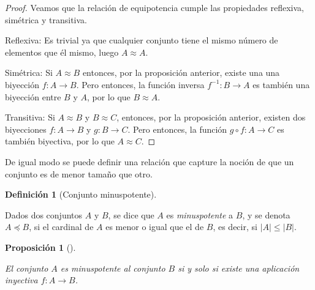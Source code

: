 \documentclass[
  a4paper,
]{scrreport}
\theoremstyle{plain}
\theoremstyle{plain}
\theoremstyle{definition}
\newtheorem{definition}{Definición}[chapter]
\theoremstyle{definition}
\theoremstyle{plain}
\newtheorem{proposition}{Proposición}[chapter]
\theoremstyle{definition}
\theoremstyle{remark}
\begin{document}
\begin{tcolorbox}[enhanced jigsaw, rightrule=.15mm, toptitle=1mm, colbacktitle=quarto-callout-note-color!10!white, bottomrule=.15mm, opacityback=0, arc=.35mm, breakable, toprule=.15mm, left=2mm, coltitle=black, colback=white, opacitybacktitle=0.6, titlerule=0mm, colframe=quarto-callout-note-color-frame, bottomtitle=1mm, title=\textcolor{quarto-callout-note-color}{\faInfo}\hspace{0.5em}{Demostración}, leftrule=.75mm]

\begin{proof}

Veamos que la relación de equipotencia cumple las propiedades reflexiva,
simétrica y transitiva.

Reflexiva: Es trivial ya que cualquier conjunto tiene el mismo número de
elementos que él mismo, luego \(A\approx A\).

Simétrica: Si \(A\approx B\) entonces, por la proposición anterior,
existe una una biyección \(f:A\longrightarrow B\). Pero entonces, la
función inversa \(f^{-1}:B\longrightarrow A\) es también una biyección
entre \(B\) y \(A\), por lo que \(B\approx A\).

Transitiva: Si \(A\approx B\) y \(B\approx C\), entonces, por la
proposición anterior, existen dos biyecciones \(f:A\longrightarrow B\) y
\(g:B\longrightarrow C\). Pero entonces, la función
\(g\circ f:A\longrightarrow C\) es también biyectiva, por lo que
\(A\approx C\).

\end{proof}

\end{tcolorbox}

De igual modo se puede definir una relación que capture la noción de que
un conjunto es de menor tamaño que otro.

\begin{definition}[Conjunto
minuspotente]\protect\hypertarget{def-conjuntos-minuspotentes}{}\label{def-conjuntos-minuspotentes}

Dados dos conjuntos \(A\) y \(B\), se dice que \(A\) es
\emph{minuspotente} a \(B\), y se denota \(A\preceq B\), si el cardinal
de \(A\) es menor o igual que el de \(B\), es decir, si
\(|A| \leq |B|\).

\end{definition}

\begin{proposition}[]\protect\hypertarget{prp-inyeccion-conjuntos-minuspotentes}{}\label{prp-inyeccion-conjuntos-minuspotentes}

El conjunto \(A\) es minuspotente al conjunto \(B\) si y solo si existe
una aplicación inyectiva \(f:A\rightarrow B\).

\end{proposition}
\end{document}
